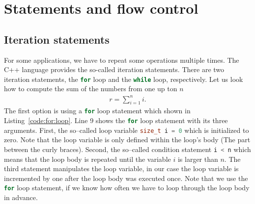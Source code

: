 \section{Statements and flow control}

\subsection{Iteration statements}
\label{sec:iteration:statements}
 For some applications, we have to repeat some operations multiple times. The C++ language provides the so-called iteration statements. There are two iteration statements, the \lstinline[language=C++]|for| loop and the \lstinline[language=C++]|while| loop, respectively. Let us look how to compute the sum of the numbers from one up ton $n$
\begin{align}
r = \sum\limits_{i=1}^n i\text{.}
\end{align}
The first option is using a \lstinline[language=C++]|for| loop statement which shown in Listing~\ref{code:for:loop}. Line 9 shows the \lstinline[language=C++]|for| loop statement with its three arguments. First, the so--called loop variable \lstinline[language=C++]{size_t i = 0} which is initialized to zero. Note that the loop variable is only defined within the loop's body (The part between the curly braces). Second, the so--called condition statement \lstinline[language=C++]{i < n} which means that the loop body is repeated until the variable $i$ is larger than $n$. The third statement manipulates the loop variable, in our case the loop variable is incremented by one after the loop body was executed once. Note that we use the \lstinline[language=C++]|for| loop statement, if we know how often we have to loop through the loop body in advance.




